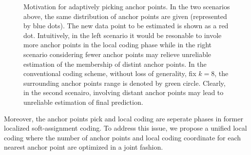 \documentclass{llncs}
\begin{document}
	\begin{figure}[!htb]
		\centering
		\hfill
		\caption{Motivation for adaptively picking anchor points. In the two scenarios above, the same distribution of anchor points are given (represented by blue dots). The new data point to be estimated is shown as a red dot. Intuitively, in the left scenario it would be resonable to invole more anchor points in the local coding phase while in the right scenario considering fewer anchor points may relieve unreliable estimation of the membership of distint anchor points. In the conventional coding scheme, without loss of generality, fix $k = 8$, the surrounding anchor points range is denoted by green circle. Clearly, in the second scenairo, involving distant anchor points may lead to unreliable estimation of final prediction.}
	\end{figure}
	 Moreover, the anchor points pick and local coding are seperate phases in former localized soft-assignment coding. To address this issue, we propose a unified local coding  where the number of anchor points and local coding coordinate for each nearest anchor point are optimized in a joint fashion.
	
\end{document}
